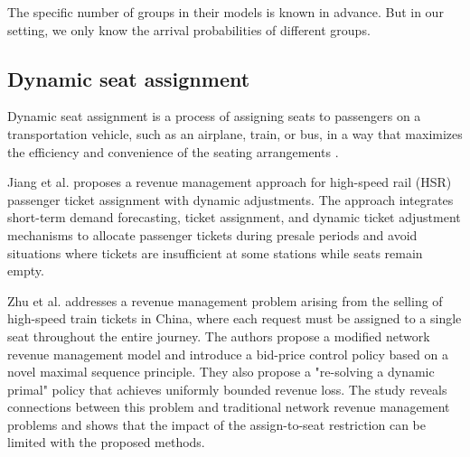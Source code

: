 The specific number of groups in their models is known in advance. But in our setting, we only know the arrival probabilities of different groups.










\subsection{Dynamic seat assignment}
Dynamic seat assignment is a process of assigning seats to passengers on a transportation vehicle, such as an airplane, train, or bus, in a way that maximizes the efficiency and convenience of the seating arrangements \cite{hamdouch2011schedule, berge1993demand}. 

Jiang et al. \cite{jiang2015dynamic} proposes a revenue management approach for high-speed rail (HSR) passenger ticket assignment with dynamic adjustments. The approach integrates short-term demand forecasting, ticket assignment, and dynamic ticket adjustment mechanisms to allocate passenger tickets during presale periods and avoid situations where tickets are insufficient at some stations while seats remain empty.


Zhu et al. \cite{zhu2023assign} addresses a revenue management problem arising from the selling of high-speed train tickets in China, where each request must be assigned to a single seat throughout the entire journey. The authors propose a modified network revenue management model and introduce a bid-price control policy based on a novel maximal sequence principle. They also propose a "re-solving a dynamic primal" policy that achieves uniformly bounded revenue loss. The study reveals connections between this problem and traditional network revenue management problems and shows that the impact of the assign-to-seat restriction can be limited with the proposed methods.

